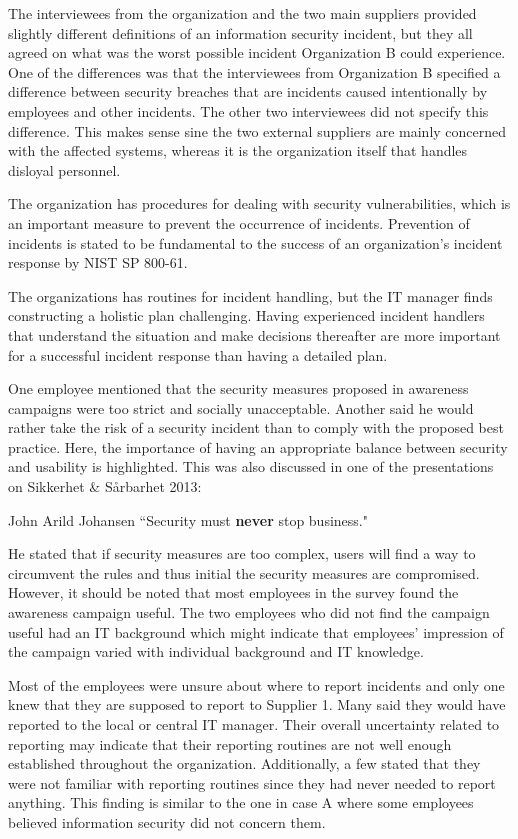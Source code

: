 The interviewees from the organization and the two main suppliers provided slightly different definitions of an information security incident, but they all agreed on what was the worst possible incident Organization B could experience. One of the differences was that the interviewees from Organization B specified a difference between security breaches that are incidents caused intentionally by employees and other incidents. The other two interviewees did not specify this difference. This makes sense sine the two external suppliers are mainly concerned with the affected systems, whereas it is the organization itself that handles disloyal personnel.

The organization has procedures for dealing with security vulnerabilities, which is an important measure to prevent the occurrence of incidents. Prevention of incidents is stated to be fundamental to the success of an organization's incident response by NIST SP 800-61.



The organizations has routines for incident handling, but the IT manager finds constructing a holistic plan challenging. Having experienced incident handlers that understand the situation and make decisions thereafter are more important for a successful incident response than having a detailed plan. 

One employee mentioned that the security measures proposed in awareness campaigns were too strict and socially unacceptable. Another said he would rather take the risk of a security incident than to comply with the proposed best practice. Here, the importance of having an appropriate balance between security and usability is highlighted. This was also discussed in one of the presentations on Sikkerhet \& S\aa rbarhet 2013:

\begin{newquote}{John Arild Johansen}
``Security must \textbf{never} stop business."
\end{newquote}

He stated that if security measures are too complex, users will find a way to circumvent the rules and thus initial the security measures are compromised. However, it should be noted that most employees in the survey found the awareness campaign useful. The two employees who did not find the campaign useful had an IT background which might indicate that employees' impression of the campaign varied with individual background and IT knowledge. 

Most of the employees were unsure about where to report incidents and only one knew that they are supposed to report to Supplier 1. Many said they would have reported to the local or central IT manager. Their overall uncertainty related to reporting may indicate that their reporting routines are not well enough established throughout the organization. Additionally, a few stated that they were not familiar with reporting routines since they had never needed to report anything. This finding is similar to the one in case A where some employees believed information security did not concern them. 

